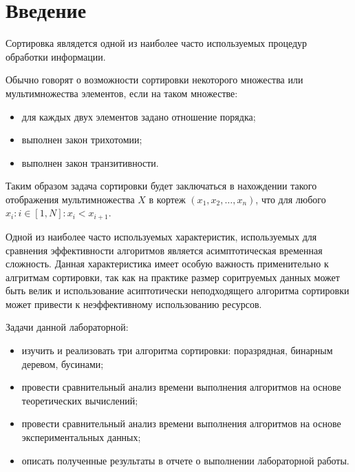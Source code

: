 \chapter*{Введение}

Сортировка являдется одной из наиболее часто используемых процедур обработки
информации.

Обычно говорят о возможности сортировки некоторого множества или мультимножества
элементов, если на таком множестве:
\begin{itemize}
    \item для каждых двух элементов задано отношение порядка;
    \item выполнен закон трихотомии;
    \item выполнен закон транзитивности.
\end{itemize}

Таким образом задача сортировки будет заключаться в нахождении такого отображения
мультимножества $X$ в кортеж $(x_1, x_2, \dots, x_n)$,
что для любого $x_i : i \in [1, N] : x_i < x_{i+1}$.


Одной из наиболее часто используемых характеристик, используемых для сравнения
эффективности алгоритмов является асимптотическая временная сложность. Данная
характеристика имеет особую важность применительно к алгритмам сортировки, так
как на практике размер соритруемых данных может быть велик и
использование асиптотически неподходящего алгоритма сортировки может привести к
неэффективному использованию ресурсов.


Задачи данной лабораторной:

\begin{itemize}
    \item изучить и реализовать три алгоритма сортировки: поразрядная, бинарным деревом, бусинами;
    \item провести сравнительный анализ времени выполнения алгоритмов на основе теоретических вычислений;
    \item провести сравнительный анализ времени выполнения алгоритмов на основе экспериментальных данных;
    \item описать полученные результаты в отчете о выполнении лабораторной работы.
\end{itemize}
